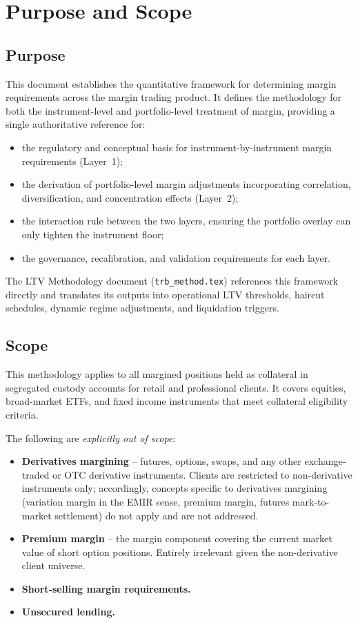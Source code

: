 \documentclass[12pt, a4paper]{article}
\begin{document}
\section{Purpose and Scope}
\label{sec:scope}

\subsection{Purpose}
This document establishes the quantitative framework for determining margin
requirements across the margin trading product. It defines the methodology
for both the instrument-level and portfolio-level treatment of margin,
providing a single authoritative reference for:
\begin{itemize}[leftmargin=1.5em]
    \item the regulatory and conceptual basis for instrument-by-instrument
    margin requirements (Layer~1);
    \item the derivation of portfolio-level margin adjustments incorporating
    correlation, diversification, and concentration effects (Layer~2);
    \item the interaction rule between the two layers, ensuring the
    portfolio overlay can only tighten the instrument floor;
    \item the governance, recalibration, and validation requirements for
    each layer.
\end{itemize}

\noindent The LTV Methodology document (\texttt{trb\_method.tex}) references
this framework directly and translates its outputs into operational LTV
thresholds, haircut schedules, dynamic regime adjustments, and liquidation
triggers.

\subsection{Scope}
This methodology applies to all margined positions held as collateral in
segregated custody accounts for retail and professional clients. It covers
equities, broad-market ETFs, and fixed income instruments that meet
collateral eligibility criteria.

\noindent The following are \emph{explicitly out of scope}:
\begin{itemize}[leftmargin=1.5em]
    \item \textbf{Derivatives margining} -- futures, options, swaps, and any
    other exchange-traded or OTC derivative instruments. Clients are restricted
    to non-derivative instruments only; accordingly, concepts specific to
    derivatives margining (variation margin in the EMIR sense, premium margin,
    futures mark-to-market settlement) do not apply and are not addressed.
    \item \textbf{Premium margin} -- the margin component covering the current
    market value of short option positions. Entirely irrelevant given the
    non-derivative client universe.
    \item \textbf{Short-selling margin requirements.}
    \item \textbf{Unsecured lending.}
\end{itemize}
\end{document}
